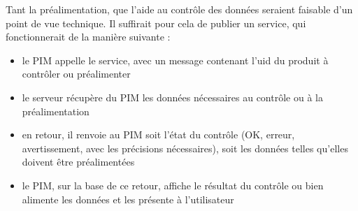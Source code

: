         Tant la préalimentation, que l'aide au contrôle des données seraient faisable d'un point de vue technique.
        Il suffirait pour cela de publier un service, qui fonctionnerait de la manière suivante : 
        \begin{itemize}
            \item le PIM appelle le service, avec un message contenant l'uid du produit à contrôler ou préalimenter
            \item le serveur récupère du PIM les données nécessaires au contrôle ou à la préalimentation
            \item en retour, il renvoie au PIM soit l'état du contrôle (OK, erreur, avertissement, avec les précisions nécessaires), soit les données telles qu'elles doivent être préalimentées
            \item le PIM, sur la base de ce retour, affiche le résultat du contrôle ou bien alimente les données et les présente à l'utilisateur
        \end{itemize}

